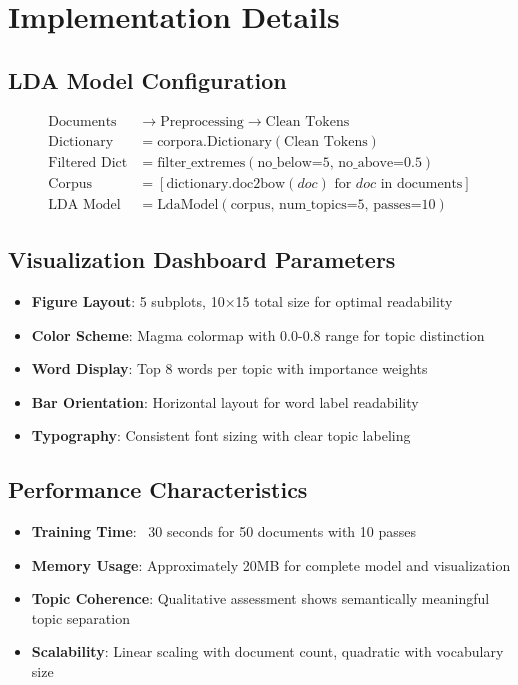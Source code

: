 \documentclass[11pt]{article}
\begin{document}
\section{Implementation Details}

\subsection{LDA Model Configuration}
\begin{align}
\text{Documents} &\rightarrow \text{Preprocessing} \rightarrow \text{Clean Tokens} \\
\text{Dictionary} &= \text{corpora.Dictionary}(\text{Clean Tokens}) \\
\text{Filtered Dict} &= \text{filter\_extremes}(\text{no\_below=5, no\_above=0.5}) \\
\text{Corpus} &= [\text{dictionary.doc2bow}(doc) \text{ for } doc \text{ in documents}] \\
\text{LDA Model} &= \text{LdaModel}(\text{corpus, num\_topics=5, passes=10})
\end{align}

\subsection{Visualization Dashboard Parameters}
\begin{itemize}
\item \textbf{Figure Layout}: 5 subplots, 10×15 total size for optimal readability
\item \textbf{Color Scheme}: Magma colormap with 0.0-0.8 range for topic distinction
\item \textbf{Word Display}: Top 8 words per topic with importance weights
\item \textbf{Bar Orientation}: Horizontal layout for word label readability
\item \textbf{Typography}: Consistent font sizing with clear topic labeling
\end{itemize}

\subsection{Performance Characteristics}
\begin{itemize}
\item \textbf{Training Time}: ~30 seconds for 50 documents with 10 passes
\item \textbf{Memory Usage}: Approximately 20MB for complete model and visualization
\item \textbf{Topic Coherence}: Qualitative assessment shows semantically meaningful topic separation
\item \textbf{Scalability}: Linear scaling with document count, quadratic with vocabulary size
\end{itemize}
\end{document}
